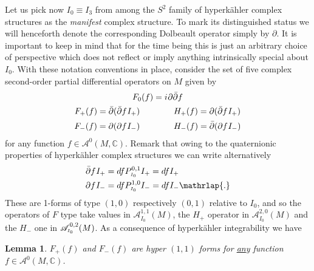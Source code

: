 \documentclass[11pt]{amsart}
\newtheorem{lemma}[theorem]{Lemma}
\theoremstyle{remark}
\theoremstyle{remark}
\theoremstyle{definition}
\theoremstyle{definition}
\theoremstyle{definition}
\newcommand{\Io}{{\scriptscriptstyle I_0}}
\newcommand{\0}{{\scriptstyle 0'}} %
\newcommand{\1}{{\scriptstyle 1'}}
\newcommand{\hp}{\hspace{0.5pt}} %
\begin{document}
Let us pick now $I_0 \equiv I_3$ from among the $S^2$ family of hyperk\"ahler complex structures as the \textit{manifest} complex structure. To mark its distinguished status we will henceforth denote the corresponding Dolbeault operator simply by $\partial$. It is important to keep in mind that for the time being this is just an arbitrary choice of perspective which does not reflect or imply anything intrinsically special about $I_0$. With these notation conventions in place, consider the set of five complex second-order partial differential operators on $M$ given by 
\begin{equation} \label{Fs_and_Hs}
\begin{gathered}
F_0(f) = i \hp \partial \bar{\partial} f  \\[0pt]
F_+(f) = \bar{\partial} (\bar{\partial} f \hp I_+) \qquad\qquad H_+(f) = \partial (\bar{\partial} f \hp I_+) \\[1pt]
F_-(f) = \partial (\partial f \hp I_-) \qquad\qquad H_-(f) = \bar{\partial} (\partial f \hp I_-)
\end{gathered}
\end{equation}
for any function $f \in \mathscr{A}^0(M,\mathbb{C})$. Remark that owing to the quaternionic properties of hyperk\"ahler complex structures we can write alternatively 
\begin{equation}
\begin{aligned}
\bar{\partial} f \hp I_+ & = df P^{0,1}_{\Io}I_+ = df I_+ \\
\partial f \hp I_- & = df P^{1,0}_{\Io}I_- = df I_- \mathrlap{.}
\end{aligned}
\end{equation}
These are 1-forms of type $(1,0)$ respectively $(0,1)$ relative to $I_0$, and so the operators of $F$ type take values in $\mathscr{A}^{1,1}_{\Io}(M)$, the $H_+$ operator in $\mathscr{A}^{2,0}_{\Io}(M)$ and the $H_-$ one in $\mathscr{A}^{\hp 0,2}_{\Io}(M)$.  As a consequence of hyperk\"ahler integrability we have

\begin{lemma} \label{F+F-}
$F_+(f)$ and $F_-(f)$ are hyper $(1,1)$ forms for \underline{any} function $f \in \mathscr{A}^0(M,\mathbb{C})$.
\end{lemma}
\end{document}
